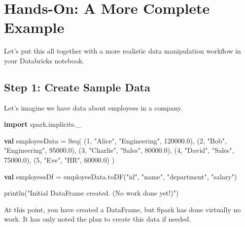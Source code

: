\documentclass[
  letterpaper,
  DIV=11,
  numbers=noendperiod]{scrreprt}
\newenvironment{Shaded}{\begin{snugshade}}{\end{snugshade}}
\newcommand{\BuiltInTok}[1]{\textcolor[rgb]{0.00,0.23,0.31}{#1}}
\newcommand{\DecValTok}[1]{\textcolor[rgb]{0.68,0.00,0.00}{#1}}
\newcommand{\FloatTok}[1]{\textcolor[rgb]{0.68,0.00,0.00}{#1}}
\newcommand{\FunctionTok}[1]{\textcolor[rgb]{0.28,0.35,0.67}{#1}}
\newcommand{\KeywordTok}[1]{\textcolor[rgb]{0.00,0.23,0.31}{\textbf{#1}}}
\newcommand{\NormalTok}[1]{\textcolor[rgb]{0.00,0.23,0.31}{#1}}
\newcommand{\OperatorTok}[1]{\textcolor[rgb]{0.37,0.37,0.37}{#1}}
\newcommand{\StringTok}[1]{\textcolor[rgb]{0.13,0.47,0.30}{#1}}
\begin{document}
\section{Hands-On: A More Complete
Example}\label{hands-on-a-more-complete-example}

Let's put this all together with a more realistic data manipulation
workflow in your Databricks notebook.

\subsection{Step 1: Create Sample Data}\label{step-1-create-sample-data}

Let's imagine we have data about employees in a company.

\begin{Shaded}
\begin{Highlighting}[]
\KeywordTok{import}\NormalTok{ spark}\OperatorTok{.}\NormalTok{implicits}\OperatorTok{.}\NormalTok{\_}

\KeywordTok{val}\NormalTok{ employeeData }\OperatorTok{=} \BuiltInTok{Seq}\OperatorTok{(}
  \OperatorTok{(}\DecValTok{1}\OperatorTok{,} \StringTok{"Alice"}\OperatorTok{,} \StringTok{"Engineering"}\OperatorTok{,} \FloatTok{120000.0}\OperatorTok{),}
  \OperatorTok{(}\DecValTok{2}\OperatorTok{,} \StringTok{"Bob"}\OperatorTok{,} \StringTok{"Engineering"}\OperatorTok{,} \FloatTok{95000.0}\OperatorTok{),}
  \OperatorTok{(}\DecValTok{3}\OperatorTok{,} \StringTok{"Charlie"}\OperatorTok{,} \StringTok{"Sales"}\OperatorTok{,} \FloatTok{80000.0}\OperatorTok{),}
  \OperatorTok{(}\DecValTok{4}\OperatorTok{,} \StringTok{"David"}\OperatorTok{,} \StringTok{"Sales"}\OperatorTok{,} \FloatTok{75000.0}\OperatorTok{),}
  \OperatorTok{(}\DecValTok{5}\OperatorTok{,} \StringTok{"Eve"}\OperatorTok{,} \StringTok{"HR"}\OperatorTok{,} \FloatTok{60000.0}\OperatorTok{)}
\OperatorTok{)}

\KeywordTok{val}\NormalTok{ employeesDf }\OperatorTok{=}\NormalTok{ employeeData}\OperatorTok{.}\FunctionTok{toDF}\OperatorTok{(}\StringTok{"id"}\OperatorTok{,} \StringTok{"name"}\OperatorTok{,} \StringTok{"department"}\OperatorTok{,} \StringTok{"salary"}\OperatorTok{)}

\FunctionTok{println}\OperatorTok{(}\StringTok{"Initial DataFrame created. (No work done yet!)"}\OperatorTok{)}
\end{Highlighting}
\end{Shaded}

At this point, you have created a DataFrame, but Spark has done
virtually no work. It has only noted the plan to create this data if
needed.
\end{document}
